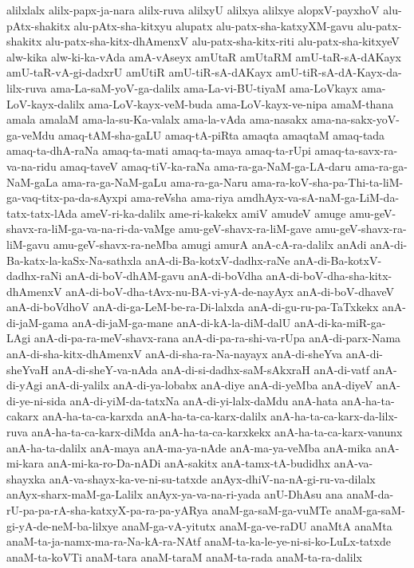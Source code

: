 {alilxlalx
alilx-papx-ja-nara
alilx-ruva
alilxyU
alilxya
alilxye
alopxV-payxhoV
alu-pAtx-shakitx
alu-pAtx-sha-kitxyu
alupatx
alu-patx-sha-katxyXM-gavu
alu-patx-shakitx
alu-patx-sha-kitx-dhAmenxV
alu-patx-sha-kitx-riti
alu-patx-sha-kitxyeV
alw-kika
alw-ki-ka-vAda
amA-vAseyx
amUtaR
amUtaRM
amU-taR-sA-dAKayx
amU-taR-vA-gi-dadxrU
amUtiR
amU-tiR-sA-dAKayx
amU-tiR-sA-dA-Kayx-da-lilx-ruva
ama-La-saM-yoV-ga-dalilx
ama-La-vi-BU-tiyaM
ama-LoVkayx
ama-LoV-kayx-dalilx
ama-LoV-kayx-veM-buda
ama-LoV-kayx-ve-nipa
amaM-thana
amala
amalaM
ama-la-su-Ka-valalx
ama-la-vAda
ama-nasakx
ama-na-sakx-yoV-ga-veMdu
amaq-tAM-sha-gaLU
amaq-tA-piRta
amaqta
amaqtaM
amaq-tada
amaq-ta-dhA-raNa
amaq-ta-mati
amaq-ta-maya
amaq-ta-rUpi
amaq-ta-savx-ra-va-na-ridu
amaq-taveV
amaq-tiV-ka-raNa
ama-ra-ga-NaM-ga-LA-daru
ama-ra-ga-NaM-gaLa
ama-ra-ga-NaM-gaLu
ama-ra-ga-Naru
ama-ra-koV-sha-pa-Thi-ta-liM-ga-vaq-titx-pa-da-sAyxpi
ama-reVsha
ama-riya
amdhAyx-va-sA-naM-ga-LiM-da-tatx-tatx-lAda
ameV-ri-ka-dalilx
ame-ri-kakekx
amiV
amudeV
amuge
amu-geV-shavx-ra-liM-ga-va-na-ri-da-vaMge
amu-geV-shavx-ra-liM-gave
amu-geV-shavx-ra-liM-gavu
amu-geV-shavx-ra-neMba
amugi
amurA
anA-cA-ra-dalilx
anAdi
anA-di-Ba-katx-la-kaSx-Na-sathxla
anA-di-Ba-kotxV-dadhx-raNe
anA-di-Ba-kotxV-dadhx-raNi
anA-di-boV-dhAM-gavu
anA-di-boVdha
anA-di-boV-dha-sha-kitx-dhAmenxV
anA-di-boV-dha-tAvx-nu-BA-vi-yA-de-nayAyx
anA-di-boV-dhaveV
anA-di-boVdhoV
anA-di-ga-LeM-be-ra-Di-lalxda
anA-di-gu-ru-pa-TaTxkekx
anA-di-jaM-gama
anA-di-jaM-ga-mane
anA-di-kA-la-diM-dalU
anA-di-ka-miR-ga-LAgi
anA-di-pa-ra-meV-shavx-rana
anA-di-pa-ra-shi-va-rUpa
anA-di-parx-Nama
anA-di-sha-kitx-dhAmenxV
anA-di-sha-ra-Na-nayayx
anA-di-sheYva
anA-di-sheYvaH
anA-di-sheY-va-nAda
anA-di-si-dadhx-saM-sAkxraH
anA-di-vatf
anA-di-yAgi
anA-di-yalilx
anA-di-ya-lobabx
anA-diye
anA-di-yeMba
anA-diyeV
anA-di-ye-ni-sida
anA-di-yiM-da-tatxNa
anA-di-yi-lalx-daMdu
anA-hata
anA-ha-ta-cakarx
anA-ha-ta-ca-karxda
anA-ha-ta-ca-karx-dalilx
anA-ha-ta-ca-karx-da-lilx-ruva
anA-ha-ta-ca-karx-diMda
anA-ha-ta-ca-karxkekx
anA-ha-ta-ca-karx-vanunx
anA-ha-ta-dalilx
anA-maya
anA-ma-ya-nAde
anA-ma-ya-veMba
anA-mika
anA-mi-kara
anA-mi-ka-ro-Da-nADi
anA-sakitx
anA-tamx-tA-budidhx
anA-va-shayxka
anA-va-shayx-ka-ve-ni-su-tatxde
anAyx-dhiV-na-nA-gi-ru-va-dilalx
anAyx-sharx-maM-ga-Lalilx
anAyx-ya-va-na-ri-yada
anU-DhAsu
ana
anaM-da-rU-pa-pa-rA-sha-katxyX-pa-ra-pa-yARya
anaM-ga-saM-ga-vuMTe
anaM-ga-saM-gi-yA-de-neM-ba-lilxye
anaM-ga-vA-yitutx
anaM-ga-ve-raDU
anaMtA
anaMta
anaM-ta-ja-namx-ma-ra-Na-kA-ra-NAtf
anaM-ta-ka-le-ye-ni-si-ko-LuLx-tatxde
anaM-ta-koVTi
anaM-tara
anaM-taraM
anaM-ta-rada
anaM-ta-ra-dalilx
}
